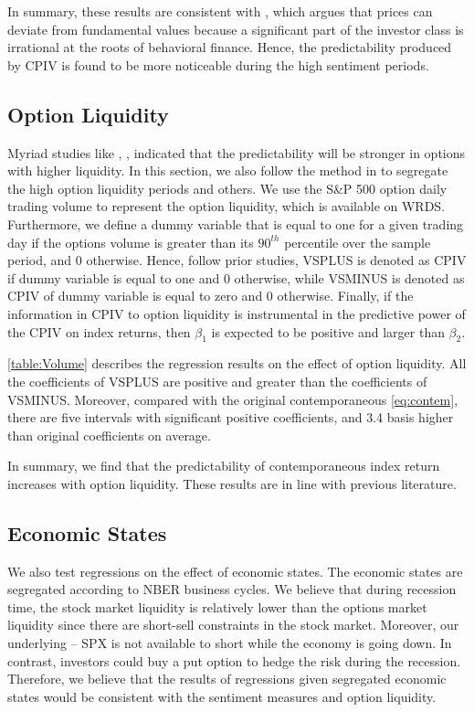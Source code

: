 In summary, these results are consistent with \textcite{baker2006investor}, which argues that prices can deviate from fundamental values because a significant part of the investor class is irrational at the roots of behavioral finance. Hence, the predictability produced by CPIV is found to be more noticeable during the high sentiment periods.  

\subsection{Option Liquidity}

Myriad studies like \textcite{easley1998option}, \textcite{cremers2010deviations}, \textcite{driessen2012option} indicated that the predictability will be stronger in options with higher liquidity. In this section, we also follow the method in \textcite{chang2018implied} to segregate the high option liquidity periods and others. We use the S\&P 500 option daily trading volume to represent the option liquidity, which is available on WRDS. Furthermore, we define a dummy variable that is equal to one for a given trading day if the options volume is greater than its $90^{th}$ percentile over the sample period, and 0 otherwise. Hence, follow prior studies, VSPLUS is denoted as CPIV if dummy variable is equal to one and 0 otherwise, while VSMINUS is denoted as CPIV of dummy variable is equal to zero and 0 otherwise. Finally, if the information in CPIV to option liquidity is instrumental in the predictive power of the CPIV on index returns, then $\beta _{1}$ is expected to be positive and larger than $\beta _{2}$.

\autoref{table:Volume} describes the regression results on the effect of option liquidity. All the coefficients of VSPLUS are positive and greater than the coefficients of VSMINUS. Moreover, compared with the original contemporaneous \autoref{eq:contem}, there are five intervals with significant positive coefficients, and 3.4 basis higher than original coefficients on average. 

In summary, we find that the predictability of contemporaneous index return increases with option liquidity. These results are in line with previous literature. 

\subsection{Economic States}

We also test regressions on the effect of economic states. The economic states are segregated according to NBER business cycles. We believe that during recession time, the stock market liquidity is relatively lower than the options market liquidity since there are short-sell constraints in the stock market. Moreover, our underlying -- SPX is not available to short while the economy is going down. In contrast, investors could buy a put option to hedge the risk during the recession. Therefore, we believe that the results of regressions given segregated economic states would be consistent with the sentiment measures and option liquidity.  

